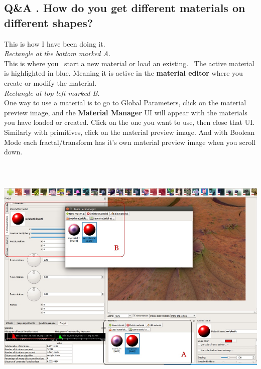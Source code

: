 \hypertarget{qa-.-how-do-you-get-different-materials-on-different-shapes}{\subsection{Q\&A
. How do you get different materials on different
shapes?}\label{qa-.-how-do-you-get-different-materials-on-different-shapes}}

This is how I have been doing it.\\[2\baselineskip]\emph{Rectangle at
the bottom marked A.}\\[2\baselineskip]This is where you~ start a new
material or load an existing.~ The active material is highlighted in
blue. Meaning it is active in the \textbf{material editor} where you
create or modify the material.\\[2\baselineskip]\emph{Rectangle at top
left marked B.}\\[2\baselineskip]One way to use a material is to go to
Global Parameters, click on the material preview image, and the
\textbf{Material Manager} UI will appear with the materials you have
loaded or created. Click on the one you want to use, then close that
UI.\\
Similarly with primitives, click on the material preview image. And with
Boolean Mode each fractal/transform has it's own material preview image
when you scroll down.

\includegraphics[width=6.69291in,height=4.68465in]{img/manual/media/image34.jpg}
